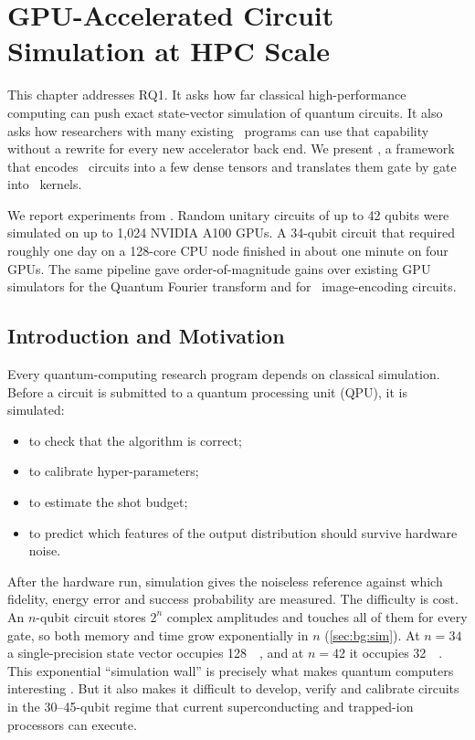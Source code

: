 \chapter{GPU-Accelerated Circuit Simulation at HPC Scale}\label{ch:qgear}

This chapter addresses RQ1. It asks how far classical high-performance computing can push exact state-vector simulation of quantum circuits. It also asks how researchers with many existing \qiskit\ programs can use that capability without a rewrite for every new accelerator back end. We present \qgear, a framework that encodes \qiskit\ circuits into a few dense tensors and translates them gate by gate into \cudaq\ kernels.

We report experiments from \cite{guo2025qgear}. Random unitary circuits of up to 42 qubits were simulated on up to 1,024 NVIDIA A100 GPUs. A 34-qubit circuit that required roughly one day on a 128-core CPU node finished in about one minute on four GPUs. The same pipeline gave order-of-magnitude gains over existing GPU simulators for the Quantum Fourier transform and for \qcrank\ image-encoding circuits.

\section{Introduction and Motivation}\label{sec:qgear:intro}

Every quantum-computing research program depends on classical simulation. Before a circuit is submitted to a quantum processing unit (QPU), it is simulated:
\begin{itemize}
  \item to check that the algorithm is correct;
  \item to calibrate hyper-parameters;
  \item to estimate the shot budget;
  \item to predict which features of the output distribution should survive hardware noise.
\end{itemize}
After the hardware run, simulation gives the noiseless reference against which fidelity, energy error and success probability are measured. The difficulty is cost. An $n$-qubit circuit stores $2^{n}$ complex amplitudes and touches all of them for every gate, so both memory and time grow exponentially in $n$ (\cref{sec:bg:sim}). At $n=34$ a single-precision state vector occupies \SI{128}{\giga\byte}, and at $n=42$ it occupies \SI{32}{\tera\byte}. This exponential ``simulation wall'' is precisely what makes quantum computers interesting \cite{arute2019supremacy,preskill2018nisq}. But it also makes it difficult to develop, verify and calibrate circuits in the 30--45-qubit regime that current superconducting and trapped-ion processors can execute.

